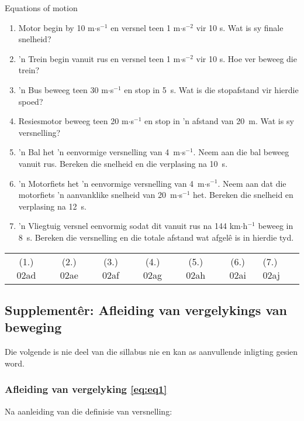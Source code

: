 \noindent
\begin{exercises}{Equations of motion}
\nopagebreak \noindent
\begin{enumerate}[noitemsep, label=\textbf{\arabic*}. ] 
    \item \n Motor begin by 10 m$\ensuremath{\cdot}$s${}^{-1}$ en versnel teen 1 m$\ensuremath{\cdot}$s${}^{-2}$ vir 10 s. Wat is sy finale snelheid?
    \item 'n Trein begin vanuit rus en versnel teen 1 m$\ensuremath{\cdot}$s${}^{-2}$ vir 10 s. Hoe ver beweeg die trein?
\item 'n Bus beweeg teen 30 m$\ensuremath{\cdot}$s${}^{-1}$ en stop in 5~s. Wat is die stopafstand vir hierdie spoed?
\item \n Resiesmotor beweeg teen 20 m$\ensuremath{\cdot}$s${}^{-1}$ en stop in 'n afstand van 20~m. Wat is sy versnelling? 
\item 'n Bal het 'n eenvormige versnelling van 4~m$\ensuremath{\cdot}$s${}^{-1}$. Neem aan die bal beweeg vanuit rus. Bereken die snelheid en die verplasing na 10~s.
\item 'n Motorfiets het 'n eenvormige versnelling van 4~m$\ensuremath{\cdot}$s${}^{-1}$. Neem aan dat die motorfiets 'n aanvanklike snelheid van 20~m$\ensuremath{\cdot}$s${}^{-1}$ het. Bereken die snelheid en verplasing na 12~s.\newline
\item 'n Vliegtuig versnel eenvormig sodat dit vanuit rus na 144 km$\ensuremath{\cdot}$h${}^{-1}$ beweeg in 8~s. Bereken die versnelling en die totale afstand wat afgel\^e is in hierdie tyd.
\end{enumerate}
    \label{m38796*cid11}
\practiceinfo
 \par \begin{tabular}[h]{cccccc}
 (1.) 02ad  &  (2.) 02ae  &  (3.) 02af  &  (4.) 02ag  &  (5.) 02ah  &  (6.) 02ai  & (7.) 02aj \end{tabular}
\end{exercises}

\subsection*{Supplement\^er: Afleiding van vergelykings van beweging}
\nopagebreak
Die volgende is nie deel van die sillabus nie en kan as aanvullende inligting gesien word.\par
            
\subsubsection*{Afleiding van vergelyking \ref{eq:eq1}}
\nopagebreak
Na aanleiding van die definisie van versnelling:\par 
\label{m38796*id76246}\nopagebreak\noindent{}
            
